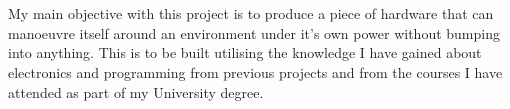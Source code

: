\\\\My main objective with this project is to produce a piece of hardware that can manoeuvre itself around an environment under it's own power without bumping into anything.  This is to be built utilising the knowledge I have gained about electronics and programming from previous projects and from the courses I have attended as part of my University degree.
